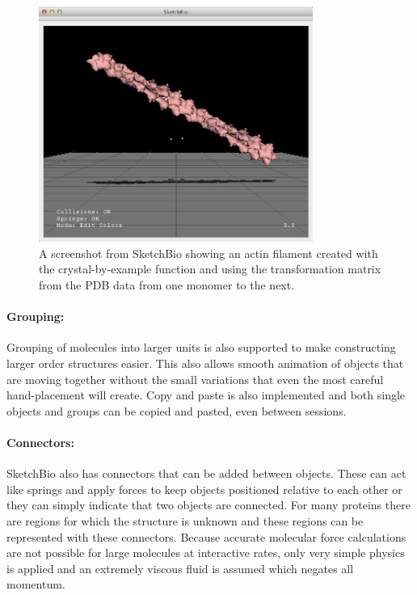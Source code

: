 \documentclass{article} %
\begin{document}
\begin{figure}[h]
\centering
\includegraphics[width=0.8\textwidth]{crystal_actin.png}
\caption{A screenshot from SketchBio showing an actin filament created with the crystal-by-example function and using the transformation matrix from the PDB data from one monomer to the next.}
\label{fig:crystal_actin}
\end{figure}
\paragraph{Grouping:}
Grouping of molecules into larger units is also supported to make constructing larger order structures easier.  This also allows smooth animation of objects that are moving together without the small variations that even the most careful hand-placement will create.  Copy and paste is also implemented and both single objects and groups can be copied and pasted, even between sessions.
\paragraph{Connectors:}
SketchBio also has connectors that can be added between objects.  These can act like springs and apply forces to keep objects positioned relative to each other or they can simply indicate that two objects are connected.  For many proteins there are regions for which the structure is unknown and these regions can be represented with these connectors.  Because accurate molecular force calculations are not possible for large molecules at interactive rates, only very simple physics is applied and an extremely viscous fluid is assumed which negates all momentum.
\end{document}
